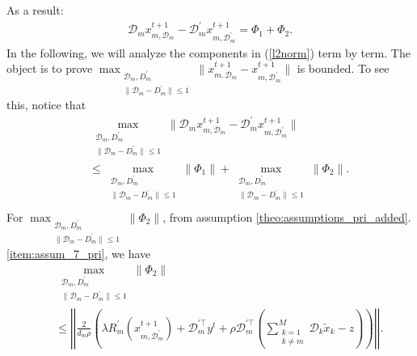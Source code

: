 As a result:
\begin{eqnarray}
\label{l2norm}
\mathcal{D}_mx_{m,\mathcal{D}_m}^{t+1}-\mathcal{D}_m^{\prime}x_{m,\mathcal{D}_m^{\prime}}^{t+1}=
\Phi_1+\Phi_2.
\end{eqnarray}
In the following, we will analyze the components in (\ref{l2norm}) term by term. The object
is to prove $\max_{\substack{\mathcal{D}_m,D_m^{\prime}\\
\|\mathcal{D}_m-D_m^{\prime}\|\leq1
}}
\|x_{m,\mathcal{D}_m}^{t+1}-x_{m,\mathcal{D}_m^{\prime}}^{t+1}\|$ is bounded.
To see this, notice that
\begin{eqnarray*}
&&\max_{\substack{\mathcal{D}_m,D_m^{\prime}\\
\|\mathcal{D}_m-D_m^{\prime}\|\leq1
}}
\|\mathcal{D}_mx_{m,\mathcal{D}_m}^{t+1}-\mathcal{D}_m^{\prime}x_{m,\mathcal{D}_m^{\prime}}^{t+1}\|\\
&&\leq\max_{\substack{\mathcal{D}_m,D_m^{\prime}\\
\|\mathcal{D}_m-D_m^{\prime}\|\leq1
}}\|\Phi_1\|
+\max_{\substack{\mathcal{D}_m,D_m^{\prime}\\
\|\mathcal{D}_m-D_m^{\prime}\|\leq1
}}\|\Phi_2\|.
\\
\end{eqnarray*}
For $\max_{\substack{\mathcal{D}_m,D_m^{\prime}\\
\|\mathcal{D}_m-D_m^{\prime}\|\leq1
}}\|\Phi_2\|$,
from assumption \ref{theo:assumptions_pri_added}.\ref{item:assum_7_pri},
we have
\begin{eqnarray*}
  &&\max_{\substack{\mathcal{D}_m,D_m^{\prime}\\
\|\mathcal{D}_m-D_m^{\prime}\|\leq1
}}\|\Phi_2\|\\
  &&\leq
\left|\left|\frac{2}{d_m\rho}
\left(
  \lambda R_m^{\prime}(x_{m,\mathcal{D}_m^{\prime}}^{t+1})+\mathcal{D}_m^{\prime\top}y^t+
  \rho\mathcal{D}_m^{\prime\top}(\sum_{\substack
{k=1\\k\neq m}}^{M}\mathcal{D}_k\tilde{x}_k-z)
\right)\right|\right|.
\end{eqnarray*}
